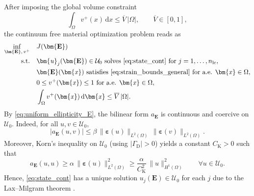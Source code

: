 \documentclass[preprint,3p]{elsarticle}
\newcommand{\tens}[1]{\bm{\mathit{#1}}}             %
\newcommand{\tenss}[1]{\bm{\mathbf{#1}}}            %
\newcommand{\tensf}[1]{\bm{\mathbf{#1}}}            %
\newcommand{\strain}{\tenss{\varepsilon}}           %
\newcommand{\nlc}{n_\mathrm{lc}}                    %
\begin{document}
After imposing the global volume constraint
%
\begin{equation}\label{eq:vol_cont}
\int_{\Omega} v^+(\tens{x})\,\mathrm{d}\tens{x} \le \overline{V}\,\lvert\Omega\rvert,\qquad \overline{V}\in[0,1],
\end{equation}
%
the continuum free material optimization problem reads as
%
\begin{subequations}\label{eq:fmo_continuum}
\begin{align}
\inf_{\tensf{E},\,v^+}\quad & J(\tensf{E})\label{eq:fmo_continuum_obj}\\
\text{s.t.}\quad
& \tens{u}_j(\tensf{E})\in\mathcal{U}_0 \text{ solves \eqref{eq:state_cont} for } j=1,\dots,\nlc,\label{eq:fmo_continuum_state}\\
& \tensf{E}(\tens{x}) \text{ satisfies \eqref{eq:strain_bounds_general} for a.e. }\tens{x}\in\Omega,\\
& 0\le v^+(\tens{x})\le 1 \ \text{for a.e. }\tens{x}\in\Omega,\label{eq:fmo_continuum_bounds}\\
& \int_{\Omega} v^+(\tens{x})\,\mathrm{d}\tens{x} \le \overline{V}\,\lvert\Omega\rvert.\label{eq:fmo_continuum_volume}
\end{align}
\end{subequations}
%
By \eqref{eq:uniform_ellipticity_E}, the bilinear form $a_{\tensf{E}}$ is continuous and coercive on $\mathcal{U}_0$. Indeed, for all $\tens{u},\tens{v}\in\mathcal{U}_0$,
%
\begin{equation}\label{eq:a_continuity}
\lvert a_{\tensf{E}}(\tens{u},\tens{v})\rvert
\le \beta\,\lVert\strain(\tens{u})\rVert_{L^2(\Omega)}\,\lVert\strain(\tens{v})\rVert_{L^2(\Omega)}.
\end{equation}
%
Moreover, Korn's inequality \citep[Definition~3.1]{NecasHlavacek_1981} on $\mathcal{U}_0$ (using $\lvert\Gamma_\mathrm D\rvert>0$) yields a constant $C_\mathrm{K}>0$ such that
%
\begin{equation}\label{eq:a_coercivity}
a_{\tensf{E}}(\tens{u},\tens{u})
\ge \alpha\,\lVert\strain(\tens{u})\rVert_{L^2(\Omega)}^2
\ge \frac{\alpha}{C_\mathrm{K}^2}\,\lVert\tens{u}\rVert_{H^1(\Omega)}^2
\qquad \forall \tens{u}\in\mathcal{U}_0.
\end{equation}
%
Hence, \eqref{eq:state_cont} has a unique solution $\tens{u}_j(\tensf{E})\in\mathcal{U}_0$ for each $j$ due to the Lax--Milgram theorem \citep[Corollary 5.8]{Brezis2011}.
\end{document}
